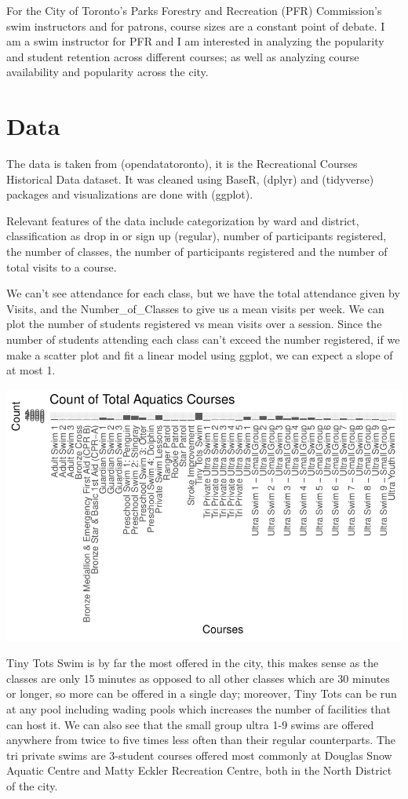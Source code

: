 \documentclass[
  letterpaper,
  DIV=11,
  numbers=noendperiod]{scrartcl}
\begin{document}
For the City of Toronto's Parks Forestry and Recreation (PFR)
Commission's swim instructors and for patrons, course sizes are a
constant point of debate. I am a swim instructor for PFR and I am
interested in analyzing the popularity and student retention across
different courses; as well as analyzing course availability and
popularity across the city.

\section{Data}\label{data}

The data is taken from (opendatatoronto), it is the Recreational Courses
Historical Data dataset. It was cleaned using BaseR, (dplyr) and
(tidyverse) packages and visualizations are done with (ggplot).

Relevant features of the data include categorization by ward and
district, classification as drop in or sign up (regular), number of
participants registered, the number of classes, the number of
participants registered and the number of total visits to a course.

We can't see attendance for each class, but we have the total attendance
given by Visits, and the Number\_of\_Classes to give us a mean visits
per week. We can plot the number of students registered vs mean visits
over a session. Since the number of students attending each class can't
exceed the number registered, if we make a scatter plot and fit a linear
model using ggplot, we can expect a slope of at most 1.

\includegraphics{paper_files/figure-pdf/unnamed-chunk-2-1.pdf}

\newpage

Tiny Tots Swim is by far the most offered in the city, this makes sense
as the classes are only 15 minutes as opposed to all other classes which
are 30 minutes or longer, so more can be offered in a single day;
moreover, Tiny Tots can be run at any pool including wading pools which
increases the number of facilities that can host it. We can also see
that the small group ultra 1-9 swims are offered anywhere from twice to
five times less often than their regular counterparts. The tri private
swims are 3-student courses offered most commonly at Douglas Snow
Aquatic Centre and Matty Eckler Recreation Centre, both in the North
District of the city.
\end{document}

